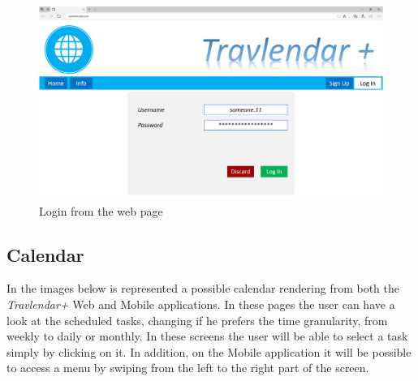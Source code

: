\begin{figure}[H]
    \centering
    \includegraphics[scale=0.25]{Pictures/Mockups/SiteLogin.png}
    \caption{Login from the web page}
\end{figure}

\subsection{Calendar}
In the images below is represented a possible calendar rendering from both the \emph{Travlendar+} Web and Mobile applications. In these pages the user can have a look at the scheduled tasks, changing if he prefers the time granularity, from weekly to daily or monthly. In these screens the user will be able to select a task simply by clicking on it. In addition, on the Mobile application it will be possible to access a menu by swiping from the left to the right part of the screen.   

